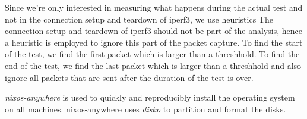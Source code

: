 Since we're only interested in measuring what happens during the actual test and not in the connection setup and teardown of iperf3, we use heuristics
The connection setup and teardown of iperf3 should not be part of the analysis, hence a heuristic is employed to ignore this part of the packet capture. To find the start of the test, we find the first packet which is larger than a threshhold. To find the end of the test, we find the last packet which is larger than a threshhold and also ignore all packets that are sent after the duration of the test is over.


\textit{nixos-anywhere} \cite{nixos-anywhere} is used to quickly and reproducibly install the operating system on all machines.
nixos-anywhere uses \textit{disko} \cite{disko} to partition and format the disks.



